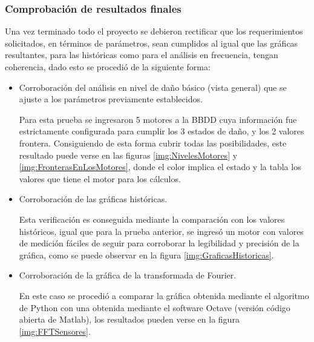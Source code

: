 \subsubsection{Comprobación de resultados finales}
Una vez terminado todo el proyecto se debieron rectificar que los requerimientos
solicitados, en términos de parámetros, sean cumplidos al igual que las gráficas
resultantes, para las históricas como para el análisis en frecuencia, tengan
coherencia, dado esto se procedió de la siguiente forma:

\begin{itemize}
    \item Corroboración del análisis en nivel de daño básico (vista general)
        que se ajuste a los parámetros previamente establecidos.

        Para esta prueba se ingresaron 5 motores a la BBDD cuya información fue
        estrictamente configurada para cumplir los 3 estados de daño, y los
        2 valores frontera. Consiguiendo de esta forma cubrir todas las
        posibilidades, este resultado puede verse en las figuras
        \ref{img:NivelesMotores}
        y
        \ref{img:FronterasEnLosMotores},     donde el color
        implica el estado y la tabla los valores que tiene el motor
        para los cálculos.


\item Corroboración de las gráficas históricas.

        Esta verificación es conseguida mediante la comparación con los valores
        históricos, igual que para la prueba anterior, se ingresó un motor
        con valores de medición fáciles de seguir para corroborar la legibilidad
        y precisión de la gráfica, como se puede observar en la figura \ref{img:GraficasHistoricas}.

    \item Corroboración de la gráfica de la transformada de Fourier.

        En este caso se procedió a comparar la gráfica obtenida mediante el
        algoritmo de Python con una obtenida mediante el software Octave (versión
        código abierta de Matlab), los resultados pueden verse en la figura
        \ref{img:FFTSensores}.
\end{itemize}







